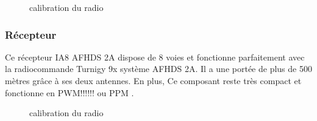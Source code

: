 \documentclass[a4paper,12pt]{book}
\begin{document}
	\begin{figure} [h]
	\begin{center}
		\centering
{}
	\end{center}
	\caption{calibration du radio}
\end{figure}
\subsubsection{Récepteur }
Ce récepteur IA8 AFHDS 2A dispose de 8 voies et fonctionne parfaitement avec la radiocommande Turnigy 9x système AFHDS 2A. Il a une portée de plus de 500 mètres  grâce à ses deux antennes. En plus, Ce composant reste très compact et fonctionne en PWM!!!!!! ou PPM .
\begin{figure} [h]
	\begin{center}
\centering
{}
	\end{center}
\caption{calibration du radio}
\end{figure}
\end{document}
